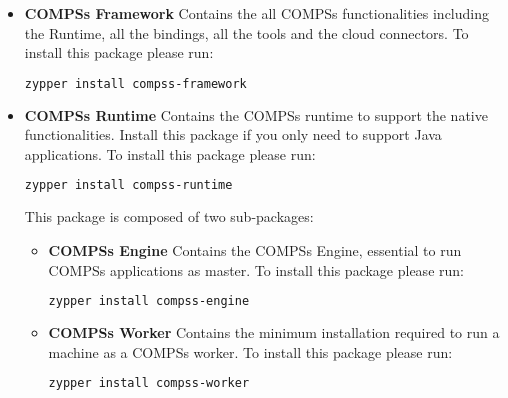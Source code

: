 \begin{itemize}
 \item \textbf{COMPSs Framework} \newline
       Contains the all COMPSs functionalities including the Runtime, all the bindings, all the tools and the cloud connectors.
       \newline
       To install this package please run:
       \begin{lstlisting}[language=bash]
	  zypper install compss-framework
       \end{lstlisting}
 \item \textbf{COMPSs Runtime} \newline
       Contains the COMPSs runtime to support the native functionalities. Install this package if you only need to support Java
       applications.
       \newline
       To install this package please run:
       \begin{lstlisting}[language=bash]
	  zypper install compss-runtime
       \end{lstlisting}
       This package is composed of two sub-packages:
       \begin{itemize}
        \item \textbf{COMPSs Engine} \newline
	      Contains the COMPSs Engine, essential to run COMPSs applications as master.
	      \newline
	      To install this package please run:
	      \begin{lstlisting}[language=bash]
		  zypper install compss-engine
	      \end{lstlisting}
        \item \textbf{COMPSs Worker} \newline
             Contains the minimum installation required to run a machine as a COMPSs worker.
              \newline
              To install this package please run:
	      \begin{lstlisting}[language=bash]
		  zypper install compss-worker
	      \end{lstlisting}
       \end{itemize}


\end{itemize}

